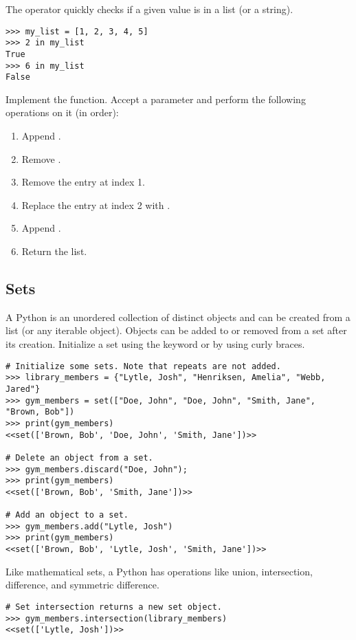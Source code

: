 The  operator quickly checks if a given value is in a list (or a string).
\begin{lstlisting}
>>> my_list = [1, 2, 3, 4, 5]
>>> 2 in my_list
True
>>> 6 in my_list
False
\end{lstlisting}

\begin{problem}
Implement the  function.
Accept a parameter  and perform the following operations on it (in order):
\begin{enumerate}
\item Append .
\item Remove .
\item Remove the entry at index 1.
\item Replace the entry at index 2 with .
\item Append .
\item Return the list.
\end{enumerate}
\end{problem}


\subsection*{Sets}
A Python  is an unordered collection of distinct objects and can be created from a list (or any iterable object).
Objects can be added to or removed from a set after its creation.
Initialize a set using the keyword  or by using curly braces.
\begin{lstlisting}
# Initialize some sets. Note that repeats are not added.
>>> library_members = {"Lytle, Josh", "Henriksen, Amelia", "Webb, Jared"}
>>> gym_members = set(["Doe, John", "Doe, John", "Smith, Jane", "Brown, Bob"])
>>> print(gym_members)
<<set(['Brown, Bob', 'Doe, John', 'Smith, Jane'])>>

# Delete an object from a set.
>>> gym_members.discard("Doe, John");
>>> print(gym_members)
<<set(['Brown, Bob', 'Smith, Jane'])>>

# Add an object to a set.
>>> gym_members.add("Lytle, Josh")
>>> print(gym_members)
<<set(['Brown, Bob', 'Lytle, Josh', 'Smith, Jane'])>>
\end{lstlisting}

Like mathematical sets, a Python  has operations like union, intersection, 
difference, and symmetric difference.
\begin{lstlisting}
# Set intersection returns a new set object.
>>> gym_members.intersection(library_members)
<<set(['Lytle, Josh'])>>
\end{lstlisting}

